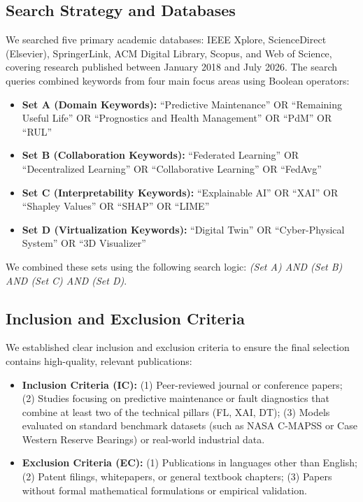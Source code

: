 \documentclass[journal,10pt,compsoc]{IEEEtran}
\begin{document}
\subsection{Search Strategy and Databases}
We searched five primary academic databases: IEEE Xplore, ScienceDirect (Elsevier), SpringerLink, ACM Digital Library, Scopus, and Web of Science, covering research published between January 2018 and July 2026. The search queries combined keywords from four main focus areas using Boolean operators:
\begin{itemize}
    \item \textbf{Set A (Domain Keywords):} ``Predictive Maintenance'' OR ``Remaining Useful Life'' OR ``Prognostics and Health Management'' OR ``PdM'' OR ``RUL''
    \item \textbf{Set B (Collaboration Keywords):} ``Federated Learning'' OR ``Decentralized Learning'' OR ``Collaborative Learning'' OR ``FedAvg''
    \item \textbf{Set C (Interpretability Keywords):} ``Explainable AI'' OR ``XAI'' OR ``Shapley Values'' OR ``SHAP'' OR ``LIME''
    \item \textbf{Set D (Virtualization Keywords):} ``Digital Twin'' OR ``Cyber-Physical System'' OR ``3D Visualizer''
\end{itemize}
We combined these sets using the following search logic: \emph{(Set A) AND (Set B) AND (Set C) AND (Set D)}.

\subsection{Inclusion and Exclusion Criteria}
We established clear inclusion and exclusion criteria to ensure the final selection contains high-quality, relevant publications:
\begin{itemize}
    \item \textbf{Inclusion Criteria (IC):} (1) Peer-reviewed journal or conference papers; (2) Studies focusing on predictive maintenance or fault diagnostics that combine at least two of the technical pillars (FL, XAI, DT); (3) Models evaluated on standard benchmark datasets (such as NASA C-MAPSS or Case Western Reserve Bearings) or real-world industrial data.
    \item \textbf{Exclusion Criteria (EC):} (1) Publications in languages other than English; (2) Patent filings, whitepapers, or general textbook chapters; (3) Papers without formal mathematical formulations or empirical validation.
\end{itemize}
\end{document}
